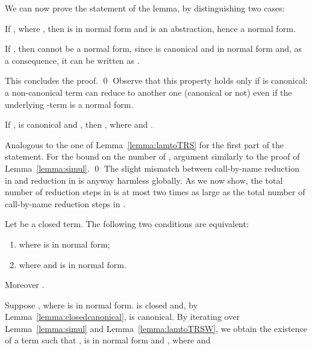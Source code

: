 \documentclass{LMCS}
\newenvironment{varitemize}
{
\begin{list}{\labelitemi}
{\setlength{\itemsep}{0.0mm}
 \setlength{\topsep}{0.0mm}
 \setlength{\parindent}{0.0mm}
 \setlength{\parskip}{0.0mm}
 \setlength{\parsep}{0.0mm}
 \setlength{\partopsep}{0.0mm}
 \setlength{\leftmargin}{15pt}
 \setlength{\labelsep}{5pt}
 \setlength{\labelwidth}{10pt}}}
{
 \end{list} 
}
\newcounter{number}
\begin{document}
We can now prove the statement of the lemma, by distinguishing two cases:
\begin{varitemize}
\item
  If ,
  where , then
   is in normal form and  is an
  abstraction, hence a normal form.
\item
  If , then  cannot be a normal form,
  since  is canonical and in normal form and, as a consequence,
  it can be written as .
\end{varitemize}
This concludes the proof.
\qed
Observe that this property holds only if  is canonical: a non-canonical term
can reduce to another one (canonical or not) even if the underlying -term
is a normal form.
\begin{lem}\label{lemma:lamtoTRSW}
If ,  is canonical and ,
then , where  and 
.
\end{lem}
\proof
Analogous to the one of Lemma~\ref{lemma:lamtoTRS} for the first part of the statement.
For the bound on the number of , argument similarly to the proof
of Lemma~\ref{lemma:simul}.
\qed
The slight mismatch between call-by-name reduction in  and
reduction in  is anyway harmless globally. As we now show, the total number of reduction
steps in  is at most two times as large as the total number of call-by-name reduction
steps in .
\begin{thm}
Let  be a closed term. The following
two conditions are equivalent:
\begin{enumerate}[\em 1.]
\item
   where  is in normal form;
\item
   where
   and  is in normal form.
\end{enumerate}
Moreover .
\end{thm}
\proof
Suppose , where  is in normal form.
 is closed and, by Lemma~\ref{lemma:closedcanonical}, 
is canonical. By iterating over Lemma~\ref{lemma:simul} and Lemma~\ref{lemma:lamtoTRSW},
we obtain the existence of a term  such that ,
 is in normal form and , where  and
\end{document}

